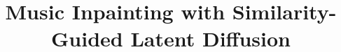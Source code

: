\documentclass{article}
\title{Music Inpainting with Similarity-Guided Latent Diffusion}
\begin{document}
\maketitle

\begin{abstract}
\vspace{-5pt}






\end{abstract}
\end{document}
